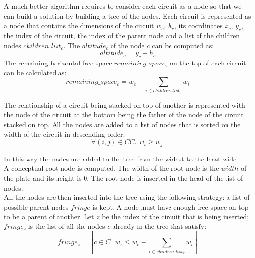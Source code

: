         A much better algorithm requires to consider each circuit as a node so that we can build a solution by building a 
        tree of the nodes. 
        Each circuit is represented as a node that contains the dimensions of the circuit $w_c$, $h_c$, its coordinates 
        $x_c$, $y_c$, the index of the circuit, the index of the parent node and a list of the children nodes 
        $children\_list_c$. The $altitude_c$ of the node \(c\) can be computed as:
        \begin{equation*}
            altitude_c = y_c + h_c
        \end{equation*}
        The remaining horizontal free space \(remaining\_space_c\) on the top of each circuit can be calculated as:
        \begin{equation*}
            remaining\_space_c = w_c - \sum_{i \in children\_list_c} w_i
        \end{equation*}
        
        The relationship of a circuit being stacked on top of another is represented with the node of the circuit at the bottom 
        being the father of the node of the circuit stacked on top.
        All the nodes are added to a list of nodes that is sorted on the width of the circuit in descending order:
        \begin{equation*}
            \forall (i,j) \in CC.\ \ w_i \geq w_j \ 
        \end{equation*}
        
        In this way the nodes are added to the tree from the widest to the least wide.\\

        A conceptual root node is computed. The width of the root node is the $width$ of the plate and its height is 0. The root
        node is inserted in the head of the list of nodes.\\

        All the nodes are then inserted into the tree using the following strategy: a list of possible parent nodes $fringe$ is kept. 
        A node must have enough free space on top to be a parent of another. Let $z$ be the index of the circuit that 
        is being inserted; $fringe_z$ is the list of all the nodes $c$ already in the tree that satisfy: 
        \begin{equation*}
            fringe_z = \left[c \in C\ |\ w_z \leq w_c - \sum_{i \in children\_list_c} w_i\right]
        \end{equation*}
        
